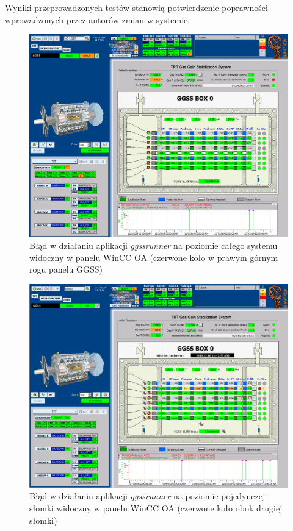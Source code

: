 Wyniki przeprowadzonych testów stanowią potwierdzenie poprawności wprowadzonych przez autorów zmian w systemie. 

\begin{figure}
\centering
\caption{Błąd w działaniu aplikacji \textit{ggssrunner} na poziomie całego systemu widoczny w panelu WinCC OA (czerwone koło w prawym górnym rogu panelu GGSS)}
\label{fig:ggssErrorScada}
\includegraphics[width=\textwidth]{res/png/ggssError}
\end{figure}


\begin{figure}
\centering
\caption{Błąd w działaniu aplikacji \textit{ggssrunner} na poziomie pojedynczej słomki widoczny w panelu WinCC OA (czerwone koło obok drugiej słomki)}
\label{fig:ggssErrorStrawScada}
\includegraphics[width=\textwidth]{res/png/errStraw}
\end{figure}
